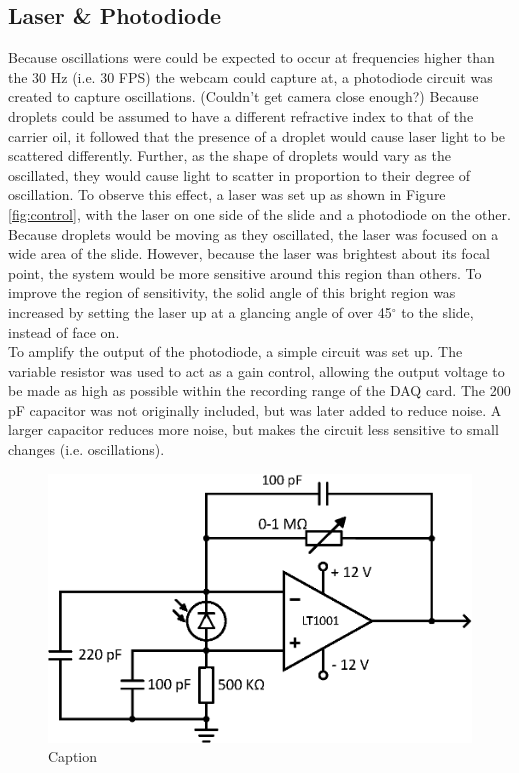 \documentclass{physics_article_B}
\begin{document}
    \subsection{Laser \& Photodiode}
    
        Because oscillations were could be expected to occur at frequencies higher than the 30 Hz (i.e. 30 FPS) the webcam could capture at, a photodiode circuit was created to capture oscillations. (Couldn't get camera close enough?) Because droplets could be assumed to have a different refractive index to that of the carrier oil\cite{viscosity1,viscosity2}, it followed that the presence of a droplet would cause laser light to be scattered differently. Further, as the shape of droplets would vary as the oscillated, they would cause light to scatter in proportion to their degree of oscillation. To observe this effect, a laser was set up as shown in Figure \ref{fig:control}, with the laser on one side of the slide and a photodiode on the other. Because droplets would be moving as they oscillated, the laser was focused on a wide area of the slide. However, because the laser was brightest about its focal point, the system would be more sensitive around this region than others. To improve the region of sensitivity, the solid angle of this bright region was increased by setting the laser up at a glancing angle of over 45$^{\circ}$ to the slide, instead of face on.\\
        
        To amplify the output of the photodiode, a simple circuit was set up\cite{artofelectronics}. The variable resistor was used to act as a gain control, allowing the output voltage to be made as high as possible within the recording range of the DAQ card. The 200 pF capacitor was not originally included, but was later added to reduce noise. A larger capacitor reduces more noise, but makes the circuit less sensitive to small changes (i.e. oscillations).
    
        \begin{figure}[H]
            \centering
            \includegraphics[scale=0.8]{Figures/PDCircuit.eps}
            \caption{Caption}
            \label{fig:my_label}
     \end{figure}
    
\end{document}
